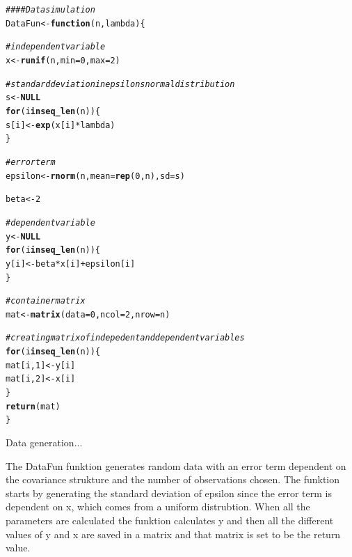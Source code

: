 \documentclass{article}\usepackage[]{graphicx}\usepackage[]{color}
\makeatletter
\newcommand{\hlnum}[1]{\textcolor[rgb]{0.686,0.059,0.569}{#1}}%
\newcommand{\hlcom}[1]{\textcolor[rgb]{0.678,0.584,0.686}{\textit{#1}}}%
\newcommand{\hlopt}[1]{\textcolor[rgb]{0,0,0}{#1}}%
\newcommand{\hlstd}[1]{\textcolor[rgb]{0.345,0.345,0.345}{#1}}%
\newcommand{\hlkwa}[1]{\textcolor[rgb]{0.161,0.373,0.58}{\textbf{#1}}}%
\newcommand{\hlkwb}[1]{\textcolor[rgb]{0.69,0.353,0.396}{#1}}%
\newcommand{\hlkwc}[1]{\textcolor[rgb]{0.333,0.667,0.333}{#1}}%
\newcommand{\hlkwd}[1]{\textcolor[rgb]{0.737,0.353,0.396}{\textbf{#1}}}%
\newenvironment{kframe}{%
 \def\at@end@of@kframe{}%
 \ifinner\ifhmode%
  \def\at@end@of@kframe{\end{minipage}}%
  \begin{minipage}{\columnwidth}%
 \fi\fi%
 \def\FrameCommand##1{\hskip\@totalleftmargin \hskip-\fboxsep
 \colorbox{shadecolor}{##1}\hskip-\fboxsep
     \hskip-\linewidth \hskip-\@totalleftmargin \hskip\columnwidth}%
 \MakeFramed {\advance\hsize-\width
   \@totalleftmargin\z@ \linewidth\hsize
   \@setminipage}}%
 {\par\unskip\endMakeFramed%
 \at@end@of@kframe}
\newenvironment{knitrout}{}{} %
\makeatother
\begin{document}
\begin{knitrout}
\color{fgcolor}\begin{kframe}
\begin{alltt}
\hlcom{#### Data simulation}
\hlstd{DataFun} \hlkwb{<-} \hlkwa{function}\hlstd{(}\hlkwc{n}\hlstd{,} \hlkwc{lambda}\hlstd{) \{}

    \hlcom{# independent variable}
    \hlstd{x} \hlkwb{<-} \hlkwd{runif}\hlstd{(n,} \hlkwc{min} \hlstd{=} \hlnum{0}\hlstd{,} \hlkwc{max} \hlstd{=} \hlnum{2}\hlstd{)}

    \hlcom{# standard deviation in epsilons normal distribution}
    \hlstd{s} \hlkwb{<-} \hlkwa{NULL}
    \hlkwa{for} \hlstd{(i} \hlkwa{in} \hlkwd{seq_len}\hlstd{(n)) \{}
        \hlstd{s[i]} \hlkwb{<-} \hlkwd{exp}\hlstd{(x[i]}\hlopt{*}\hlstd{lambda)}
    \hlstd{\}}

    \hlcom{# error term}
    \hlstd{epsilon} \hlkwb{<-} \hlkwd{rnorm}\hlstd{(n,} \hlkwc{mean} \hlstd{=} \hlkwd{rep}\hlstd{(}\hlnum{0}\hlstd{, n),} \hlkwc{sd} \hlstd{= s)}

    \hlstd{beta} \hlkwb{<-} \hlnum{2}

    \hlcom{# dependent variable}
    \hlstd{y} \hlkwb{<-} \hlkwa{NULL}
    \hlkwa{for} \hlstd{(i} \hlkwa{in} \hlkwd{seq_len}\hlstd{(n)) \{}
        \hlstd{y[i]} \hlkwb{<-} \hlstd{beta}\hlopt{*}\hlstd{x[i]} \hlopt{+} \hlstd{epsilon[i]}
    \hlstd{\}}

    \hlcom{# container matrix}
    \hlstd{mat} \hlkwb{<-} \hlkwd{matrix}\hlstd{(}\hlkwc{data} \hlstd{=} \hlnum{0}\hlstd{,} \hlkwc{ncol} \hlstd{=} \hlnum{2}\hlstd{,} \hlkwc{nrow} \hlstd{= n)}

    \hlcom{# creating matrix of indepedent and dependent variables}
    \hlkwa{for} \hlstd{(i} \hlkwa{in} \hlkwd{seq_len}\hlstd{(n)) \{}
        \hlstd{mat[i,} \hlnum{1}\hlstd{]} \hlkwb{<-} \hlstd{y[i]}
        \hlstd{mat[i,} \hlnum{2}\hlstd{]} \hlkwb{<-} \hlstd{x[i]}
    \hlstd{\}}
    \hlkwd{return}\hlstd{(mat)}
\hlstd{\}}
\end{alltt}
\end{kframe}
\end{knitrout}

Data generation...

The DataFun funktion generates random data with an error term dependent on the covariance strukture \lambda and the number of observations chosen. The funktion starts by generating the standard deviation of epsilon since the error term is dependent on x, which comes from a uniform distrubtion. When all the parameters are calculated the funktion calculates y and then all the different values of y and x are saved in a matrix and that matrix is set to be the return value.
\end{document}
